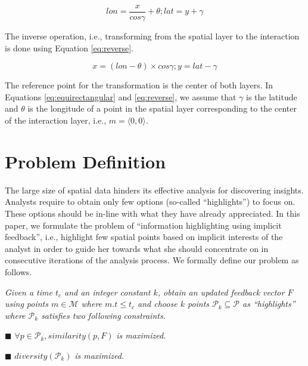 \documentclass[sigconf,edbt]{acmart-edbt2019}
\begin{document}
\begin{equation}\label{eq:equirectangular}
\mathit{lon} = \frac{x}{\mathit{cos}\gamma} + \theta; \mathit{lat} = y + \gamma 
\end{equation}

The inverse operation, i.e., transforming from the spatial layer to the interaction is done using Equation \ref{eq:reverse}.

\begin{equation}\label{eq:reverse}
x = (\mathit{lon} - \theta) \times \mathit{cos}\gamma; y = \mathit{lat} - \gamma
\end{equation}

\vspace{2pt}
The reference point for the transformation is the center of both layers. In Equations \ref{eq:equirectangular} and \ref{eq:reverse}, we assume that $\gamma$ is the latitude and $\theta$ is the longitude of a point in the spatial layer corresponding to the center of the interaction layer, i.e., $m= \langle 0,0 \rangle$.

\section{Problem Definition}
\label{sec:problem}
The large size of spatial data hinders its effective analysis for discovering insights. Analysts require to obtain only few options (so-called ``highlights'') to focus on. These options should be in-line with what they have already appreciated. In this paper, we formulate the problem of ``information highlighting using implicit feedback'', i.e., highlight few spatial points based on implicit interests of the analyst in order to guide her towards what she should concentrate on in consecutive iterations of the analysis process. We formally define our problem as follows.

\vspace{3pt}
 {\em Given a time $t_c$ and an integer constant $k$, obtain an updated feedback vector $F$ using points $m \in \mathcal{M}$ where $m.t \leq t_c$ and choose $k$ points $\mathcal{P}_k \subseteq \mathcal{P}$ as ``highlights'' where $\mathcal{P}_k$ satisfies two following constraints.}

\vspace{2pt}
\noindent $\blacksquare$ $\forall p \in \mathcal{P}_k, \mathit{similarity}(p,F)$ {\em is maximized.}

\vspace{2pt}
\noindent $\blacksquare$ $\mathit{diversity}(\mathcal{P}_k)$ {\em is maximized.}
\end{document}
